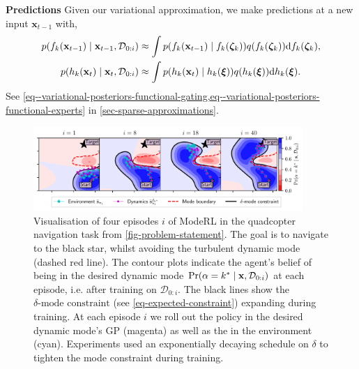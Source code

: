 \documentclass[twoside]{article}
\newcommand{\numData}{\ensuremath{t}}
\newcommand{\modeInd}{\ensuremath{k}}
\newcommand{\mode}[1]{\ensuremath{#1_{\modeInd}}}
\newcommand{\state}{\ensuremath{\mathbf{x}}}
\newcommand{\x}{\ensuremath{\mathbf{x}}}
\newcommand{\dataset}{\ensuremath{\mathcal{D}}}
\newcommand{\singleInput}{\ensuremath{\x_{\numData-1}}}
\newcommand{\modeVar}{\ensuremath{\alpha}}
\newcommand{\gatingFunc}{\ensuremath{h}}
\newcommand{\latentFunc}{\ensuremath{f}}
\begin{document}
\textbf{Predictions}
Given our variational approximation, we make predictions at a new input \(\singleInput\) with,
\small
\begin{equation} \label{eq-dynamics-approx-predictions}
\begin{aligned}
p(\mode{\latentFunc}(\singleInput) \mid \singleInput, \dataset_{0:i})
&\approx \int p(\mode{\latentFunc}(\singleInput) \mid \mode{\latentFunc}(\expertInducingInput))
q(\mode{\latentFunc}(\expertInducingInput)) \text{d} \mode{\latentFunc}(\expertInducingInput), \nonumber \\
p(\mode{\gatingFunc}(\state_{\timeInd}) \mid \state_{\timeInd}, \dataset_{0:i})
&\approx \int p(\mode{\gatingFunc}(\state_{\timeInd}) \mid \mode{\gatingFunc}(\gatingInducingInput))
q(\mode{\gatingFunc}(\gatingInducingInput))
\text{d} \mode{\gatingFunc}(\gatingInducingInput). \nonumber
\end{aligned}
\end{equation}
\normalsize
See \cref{eq--variational-posteriors-functional-gating,eq--variational-posteriors-functional-experts} in \cref{sec-sparse-approximations}.

\begin{figure}[!t]
  \centering
  \includegraphics[width=0.91\textwidth]{../experiments/figures/moderl_four_iterations_in_row.pdf}
  \caption{Visualisation of four episodes $i$ of ModeRL in the quadcopter navigation task from
  \cref{fig-problem-statement}.
  The goal is to navigate to the black star, whilst avoiding the turbulent dynamic mode (dashed red line).
  The contour plots indicate the agent's belief of being in the desired dynamic mode $\Pr(\modeVar=\desiredMode \mid \state, \dataset_{0:i})$ at each episode,
  i.e. after training on $\dataset_{0:i}$.
  The black lines show the $\delta\text{-mode constraint}$ (see \cref{eq-expected-constraint}) expanding during training.
  At each episode $i$ we roll out the policy in the desired dynamic mode's GP (magenta) as well as the in the environment (cyan). Experiments used an exponentially decaying schedule on $\delta$ to tighten the mode constraint during training.}
  \label{fig-joint-entropy-four-episodes}
\end{figure}
\end{document}
